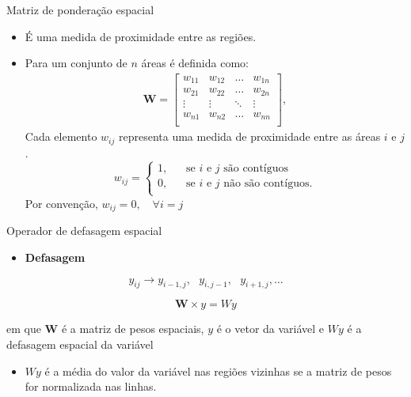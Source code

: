 \documentclass[aspectratio=169]{beamer}
\begin{document}
\begin{frame}{Matriz de ponderação espacial}
	\begin{itemize}
	    \item É uma medida de proximidade entre as regiões.
	    \item Para um conjunto de $n$ áreas é definida como: 
	    \begin{align*}
        	\boldsymbol{W} =
	        \left[
	        \begin{array}{cccc}
		        w_{11} & w_{12} & \dots & w_{1n} \\
		        w_{21} & w_{22} & \dots &w_{2n} \\
		        \vdots & \vdots & \ddots & \vdots \\
		        w_{n1} & w_{n2} & \dots & w_{nn}\\
	        \end{array}
	        \right],
        \end{align*}
        \noindent Cada elemento $w_{ij}$ representa uma medida de proximidade entre as áreas $i$ e $j$. 
        \[
            w_{ij} = 
            \begin{cases}
                \text{1,} & \quad\text{se $i$ e $j$ são contíguos} \\
                \text{0,} & \quad\text{se $i$ e $j$ não são contíguos.}\\
            \end{cases}
        \]
        \noindent Por convenção, $w_{ij}=0,\quad \forall i=j$
	\end{itemize}
\end{frame}

\begin{frame}{Operador de defasagem espacial}
    \begin{itemize}
        \item \textbf{Defasagem}
    \end{itemize}
    $$y_{ij} \rightarrow y_{i-1,j},\text{ } y_{i,j-1},\text{ } y_{i+1,j},\dots$$  
    \begin{block}{}
        $$ \boldsymbol{W} \times y = Wy $$    
    \end{block}
    \noindent em que $\boldsymbol{W}$ é a matriz de pesos espaciais, $y$ é o vetor da variável e $Wy$ é a defasagem espacial da variável
    \begin{itemize}
        \item $Wy$ é a média do valor da variável nas regiões vizinhas se a matriz de pesos for normalizada nas linhas.
    \end{itemize}
\end{frame}
\end{document}
